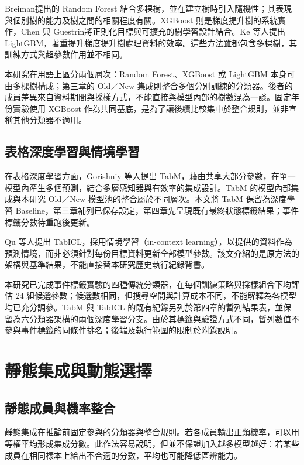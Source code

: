 Breiman\autocite{breiman2001rf}提出的 Random Forest 結合多棵樹，並在建立樹時引入隨機性；其表現與個別樹的能力及樹之間的相關程度有關。XGBoost 則是梯度提升樹的系統實作，Chen 與 Guestrin\autocite{chen2016xgboost}將正則化目標與可擴充的樹學習設計結合。Ke 等人\autocite{ke2017lightgbm}提出 LightGBM，著重提升梯度提升樹處理資料的效率。這些方法雖都包含多棵樹，其訓練方式與超參數作用並不相同。

本研究在用語上區分兩個層次：Random Forest、XGBoost 或 LightGBM 本身可由多棵樹構成；第三章的 Old／New 集成則整合多個分別訓練的分類器。後者的成員差異來自資料期間與採樣方式，不能直接與模型內部的樹數混為一談。固定年份實驗使用 XGBoost 作為共同基底，是為了讓後續比較集中於整合規則，並非宣稱其他分類器不適用。

\subsection{表格深度學習與情境學習}

在表格深度學習方面，Gorishniy 等人\autocite{gorishniy2025tabm}提出 TabM，藉由共享大部分參數，在單一模型內產生多個預測，結合多層感知器與有效率的集成設計。TabM 的模型內部集成與本研究 Old／New 模型池的整合屬於不同層次。本文將 TabM 保留為深度學習 Baseline，第三章補列已保存設定，第四章先呈現既有最終狀態標籤結果；事件標籤分數待重跑後更新。

Qu 等人\autocite{qu2025tabicl}提出 TabICL，採用情境學習（in-context learning），以提供的資料作為預測情境，而非必須針對每份目標資料更新全部模型參數。該文介紹的是原方法的架構與基準結果，不能直接替本研究歷史執行紀錄背書。

本研究已完成事件標籤實驗的四種傳統分類器，在每個訓練策略與採樣組合下均評估 24 組候選參數；候選數相同，但搜尋空間與計算成本不同，不能解釋為各模型均已充分調參。TabM 與 TabICL 的既有紀錄另列於第四章的暫列結果表，並保留為六分類器架構的兩個深度學習分支。由於其標籤與驗證方式不同，暫列數值不參與事件標籤的同條件排名；後端及執行範圍的限制於附錄說明。

\section{靜態集成與動態選擇}

\subsection{靜態成員與機率整合}

靜態集成在推論前固定參與的分類器與整合規則。若各成員輸出正類機率，可以用等權平均形成集成分數。此作法容易說明，但並不保證加入越多模型越好：若某些成員在相同樣本上給出不合適的分數，平均也可能降低區辨能力。


